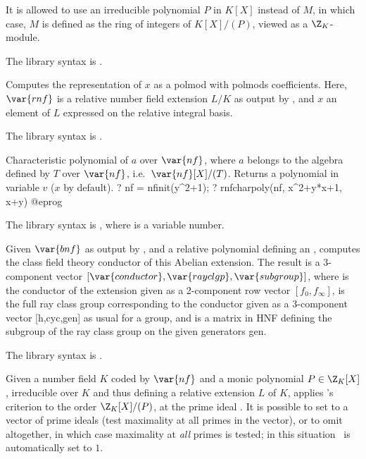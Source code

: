 It is allowed to use an irreducible polynomial $P$ in $K[X]$ instead of $M$,
in which case, $M$ is defined as the ring of integers of $K[X]/(P)$, viewed
as a $\Z_K$-module.

The library syntax is .

\label{se:rnfbasistoalg}
Computes the representation of $x$
as a polmod with polmods coefficients. Here, $\var{rnf}$ is a relative number
field extension $L/K$ as output by , and $x$ an element of
$L$ expressed on the relative integral basis.

The library syntax is .

\label{se:rnfcharpoly}
Characteristic polynomial of
$a$ over $\var{nf}$, where $a$ belongs to the algebra defined by $T$ over
$\var{nf}$, i.e.~$\var{nf}[X]/(T)$. Returns a polynomial in variable $v$
($x$ by default).
\bprog
? nf = nfinit(y^2+1);
? rnfcharpoly(nf, x^2+y*x+1, x+y)
@eprog

The library syntax is , where  is a variable number.

\label{se:rnfconductor}
Given $\var{bnf}$
as output by , and  a relative polynomial defining an
, computes the class field theory conductor of this
Abelian extension. The result is a 3-component vector
$[\var{conductor},\var{rayclgp},\var{subgroup}]$, where  is
the conductor of the extension given as a 2-component row vector
$[f_0,f_\infty]$,  is the full ray class group corresponding to
the conductor given as a 3-component vector [h,cyc,gen] as usual for a group,
and  is a matrix in HNF defining the subgroup of the ray class
group on the given generators gen.

The library syntax is .

\label{se:rnfdedekind}
Given a number field $K$ coded by $\var{nf}$ and a monic
polynomial $P\in \Z_K[X]$, irreducible over $K$ and thus defining a relative
extension $L$ of $K$, applies 's criterion to the order
$\Z_K[X]/(P)$, at the prime ideal . It is possible to set 
to a vector of prime ideals (test maximality at all primes in the vector),
or to omit altogether, in which case maximality at \emph{all} primes is tested;
in this situation \fl\ is automatically set to $1$.

